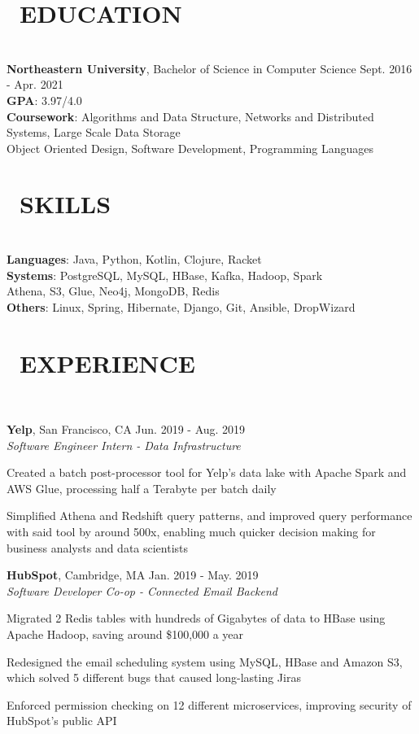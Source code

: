 \documentclass[11pt]{res}
\newcommand{\sectionunderline}{\vspace{-3mm}\hrulefill\\}
\newcommand{\listingtab}{\tabto{2.8cm}}
\newcommand{\newsect}[1]{\section{\Large \bf #1}}
\newcommand{\email}[1]{\faEnvelope\hspace{1mm} \href{mailto:#1}{#1}}
\newcommand{\github}[1]{\faGithubAlt\hspace{1mm} \href{https://github.com/#1}{#1}}
\newcommand{\linkedin}[1]{\faLinkedinSquare\hspace{1mm} \href{https://linkedin.com/in/#1}{#1}}
\begin{document}
\address{
  \large\email{derekpham67@gmail.com}\:
  \large{$\bullet$}
  \large\github{derekpham}\:
  \large{$\bullet$}
  \large\linkedin{derek-pham97}\\
}

\begin{resume}
  \newsect{\faGraduationCap\ EDUCATION}{
    \sectionunderline{
      {\bf Northeastern University}, Bachelor of Science in Computer Science \hfill Sept. 2016 - Apr. 2021\\
      {\bf GPA}: \listingtab 3.97/4.0\\
      {\bf Coursework}: \listingtab Algorithms and Data Structure, Networks and Distributed Systems, Large Scale Data Storage\\
      \listingtab Object Oriented Design, Software Development, Programming Languages
    }
  }

  \newsect{\faCogs\ SKILLS}{
    \sectionunderline{
      {\bf Languages}: \listingtab Java, Python, Kotlin, Clojure, Racket\\
      {\bf Systems}: \listingtab PostgreSQL, MySQL, HBase, Kafka, Hadoop, Spark\\
      \listingtab Athena, S3, Glue, Neo4j, MongoDB, Redis\\
      {\bf Others}: \listingtab Linux, Spring, Hibernate, Django, Git, Ansible, DropWizard
    }
  }

  \newsect{\faUsers\ EXPERIENCE}{
    \sectionunderline{
      {\bf Yelp}, San Francisco, CA \hfill Jun. 2019 - Aug. 2019\\
      {\it Software Engineer Intern - Data Infrastructure}
      \begin{itemize}
        {\item Created a batch post-processor tool for Yelp's data lake with Apache Spark and AWS Glue, processing half a Terabyte per batch daily}
        {\item Simplified Athena and Redshift query patterns, and improved query performance with said tool by around 500x, enabling much quicker decision making for business analysts and data scientists}
      \end{itemize}

      {\bf HubSpot}, Cambridge, MA \hfill Jan. 2019 - May. 2019\\
      {\it Software Developer Co-op - Connected Email Backend}
      \begin{itemize}
        {\item Migrated 2 Redis tables with hundreds of Gigabytes of data to HBase using Apache Hadoop, saving around \$100,000 a year}
        {\item Redesigned the email scheduling system using MySQL, HBase and Amazon S3, which solved 5 different bugs that caused long-lasting Jiras}
        {\item Enforced permission checking on 12 different microservices, improving security of HubSpot's public API}
      \end{itemize}

}}
\end{resume}
\end{document}
